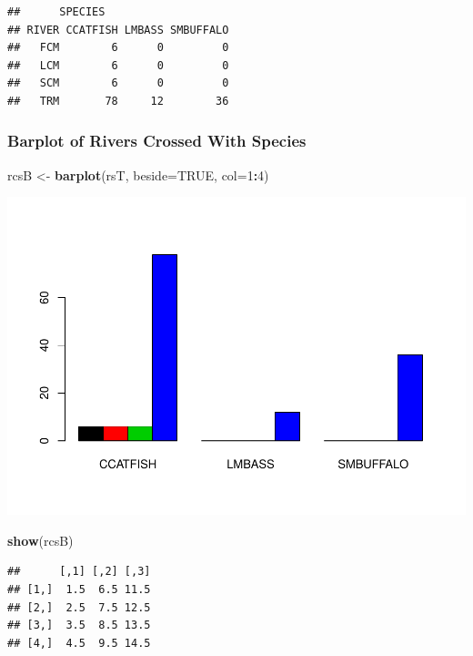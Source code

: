 \documentclass[]{article}
\newenvironment{Shaded}{\begin{snugshade}}{\end{snugshade}}
\newcommand{\KeywordTok}[1]{\textcolor[rgb]{0.13,0.29,0.53}{\textbf{#1}}}
\newcommand{\DataTypeTok}[1]{\textcolor[rgb]{0.13,0.29,0.53}{#1}}
\newcommand{\DecValTok}[1]{\textcolor[rgb]{0.00,0.00,0.81}{#1}}
\newcommand{\StringTok}[1]{\textcolor[rgb]{0.31,0.60,0.02}{#1}}
\newcommand{\OtherTok}[1]{\textcolor[rgb]{0.56,0.35,0.01}{#1}}
\newcommand{\OperatorTok}[1]{\textcolor[rgb]{0.81,0.36,0.00}{\textbf{#1}}}
\newcommand{\NormalTok}[1]{#1}
\begin{document}
\begin{verbatim}
##      SPECIES
## RIVER CCATFISH LMBASS SMBUFFALO
##   FCM        6      0         0
##   LCM        6      0         0
##   SCM        6      0         0
##   TRM       78     12        36
\end{verbatim}

\subsubsection{Barplot of Rivers Crossed With
Species}\label{barplot-of-rivers-crossed-with-species}

\begin{Shaded}
\begin{Highlighting}[]
\NormalTok{rcsB <-}\StringTok{ }\KeywordTok{barplot}\NormalTok{(rsT, }\DataTypeTok{beside=}\OtherTok{TRUE}\NormalTok{, }\DataTypeTok{col=}\DecValTok{1}\OperatorTok{:}\DecValTok{4}\NormalTok{)}
\end{Highlighting}
\end{Shaded}

\includegraphics{./tex2pdf.8500/6eefa40cd5347852e59d3e6edaccd4b2c80d30ee.pdf}

\begin{Shaded}
\begin{Highlighting}[]
\KeywordTok{show}\NormalTok{(rcsB)}
\end{Highlighting}
\end{Shaded}

\begin{verbatim}
##      [,1] [,2] [,3]
## [1,]  1.5  6.5 11.5
## [2,]  2.5  7.5 12.5
## [3,]  3.5  8.5 13.5
## [4,]  4.5  9.5 14.5
\end{verbatim}
\end{document}
